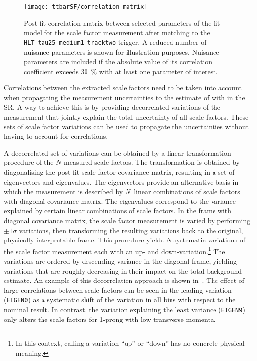 \begin{figure}[htbp]
  \centering

  \texttt{[image: ttbarSF/correlation\_matrix]}

  \caption{Post-fit correlation matrix between selected parameters of
    the fit model for the \faketauhadvis scale factor measurement
    after matching \tauhadvis to the
    \texttt{HLT\_tau25\_medium1\_tracktwo} trigger. A reduced number
    of nuisance parameters is shown for illustration
    purposes. Nuisance parameters are included if the absolute value
    of its correlation coefficient exceeds \SI{30}{\percent} with at
    least one parameter of interest.}%
  \label{fig:ttbarSF_corr_matrix}
\end{figure}

Correlations between the extracted scale factors need to be taken into account
when propagating the measurement uncertainties to the estimate of \ttbar with
\faketauhadvis in the \hadhad SR. A way to achieve this is by providing
decorrelated variations of the measurement that jointly explain the total
uncertainty of all scale factors. These sets of scale factor variations can be
used to propagate the uncertainties without having to account for correlations.

A decorrelated set of variations can be obtained by a linear
transformation procedure of the $N$ measured scale factors. The
transformation is obtained by diagonalising the post-fit scale factor
covariance matrix, resulting in a set of eigenvectors and
eigenvalues. The eigenvectors provide an alternative basis in which
the measurement is described by $N$~linear combinations of scale
factors with diagonal covariance matrix. The eigenvalues correspond to
the variance explained by certain linear combinations of scale
factors. %
In the frame with diagonal covariance matrix, the scale factor
measurement is varied by performing $\pm 1 \sigma$ variations, then
transforming the resulting variations back to the original, physically
interpretable frame. This procedure yields $N$ systematic variations
of the scale factor measurement each with an up- and
down-variation.\footnote{In this context, calling a variation ``up''
  or ``down'' has no concrete physical meaning.} The variations are
ordered by descending variance in the diagonal frame, yielding
variations that are roughly decreasing in their impact on the total
\ttbarFakes background estimate. An example of this decorrelation
approach is shown in~. The effect of
large correlations between scale factors can be seen in the leading
variation (\texttt{EIGEN0}) as a systematic shift of the variation in
all bins with respect to the nominal result. In contrast, the
variation explaining the least variance (\texttt{EIGEN9}) only alters
the scale factors for 1-prong \faketauhadvis with low transverse
momenta.

